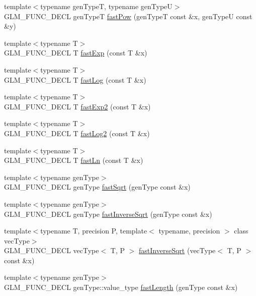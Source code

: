 \begin{CompactItemize}
\item 
{\footnotesize template$<$typename genTypeT, typename genTypeU$>$ }\\GLM\_\-FUNC\_\-DECL genTypeT \hyperlink{group__gtx__fast__exponential_g1cbcbe8fc0fd21f221cfc10104a3a773}{fastPow} (genTypeT const \&x, genTypeU const \&y)
\item 
{\footnotesize template$<$typename T$>$ }\\GLM\_\-FUNC\_\-DECL T \hyperlink{group__gtx__fast__exponential_g40d33b6bb8287eac031ee6226f1e2285}{fastExp} (const T \&x)
\item 
{\footnotesize template$<$typename T$>$ }\\GLM\_\-FUNC\_\-DECL T \hyperlink{group__gtx__fast__exponential_g8f05b41fb9e7991a5a73f6d4a281d3f3}{fastLog} (const T \&x)
\item 
{\footnotesize template$<$typename T$>$ }\\GLM\_\-FUNC\_\-DECL T \hyperlink{group__gtx__fast__exponential_g4279c1c329936c70e919a1d11e6125e3}{fastExp2} (const T \&x)
\item 
{\footnotesize template$<$typename T$>$ }\\GLM\_\-FUNC\_\-DECL T \hyperlink{group__gtx__fast__exponential_gb7e579d5f2bf90e6b68baf3071a5c4a8}{fastLog2} (const T \&x)
\item 
{\footnotesize template$<$typename T$>$ }\\GLM\_\-FUNC\_\-DECL T \hyperlink{group__gtx__fast__exponential_g5ffa4e8267716faa2e164a6e0a7335fe}{fastLn} (const T \&x)
\item 
{\footnotesize template$<$typename genType$>$ }\\GLM\_\-FUNC\_\-DECL genType \hyperlink{group__gtx__fast__square__root_g4a192efe46a74d13ab40067f7e3714e3}{fastSqrt} (genType const \&x)
\item 
{\footnotesize template$<$typename genType$>$ }\\GLM\_\-FUNC\_\-DECL genType \hyperlink{group__gtx__fast__square__root_g38b3acc3e6a37b2e6f78e2bb29585047}{fastInverseSqrt} (genType const \&x)
\item 
{\footnotesize template$<$typename T, precision P, template$<$ typename, precision $>$ class vecType$>$ }\\GLM\_\-FUNC\_\-DECL vecType$<$ T, P $>$ \hyperlink{group__gtx__fast__square__root_ge34c9d81e02deb1042789aa4dc98cfc9}{fastInverseSqrt} (vecType$<$ T, P $>$ const \&x)
\item 
{\footnotesize template$<$typename genType$>$ }\\GLM\_\-FUNC\_\-DECL genType::value\_\-type \hyperlink{group__gtx__fast__square__root_g49395da3932ad3f2b33d6b874aa1de0d}{fastLength} (genType const \&x)

\end{CompactItemize}
